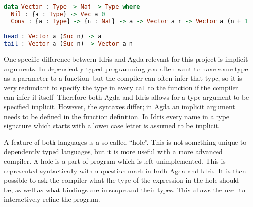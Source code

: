 
\begin{lstlisting}[language=Haskell,label={lst:depex},caption={Definition of
a vector type in Idris, the type signatures of \textit{head} and \textit{tail}. \textit{n} is a type parameter, in this case it is a natural number.  }]
data Vector : Type -> Nat -> Type where
  Nil : {a : Type} -> Vec a 0
  Cons : {a : Type} -> {n : Nat} -> a -> Vector a n -> Vector a (n + 1)

head : Vector a (Suc n) -> a
tail : Vector a (Suc n) -> Vector a n
\end{lstlisting}




%

One specific difference between Idris and Agda relevant for this project is
implicit arguments. In dependently typed programming you often want to have
some type as a parameter to a function, but the compiler can often infer that
type, so it is very redundant to specify the type in every call to the function
if the compiler can infer it itself. Therefore both Agda and Idris allows for
a type argument to be specified implicit. However, the syntaxes differ; in Agda
an implicit argument needs to be defined in the function definition. In Idris
every name in a type signature which starts with a lower case letter is assumed
to be implicit.

A feature of both languages is a so called ``hole''. This is not something unique
to dependently typed languages, but it is more useful with a more advanced
compiler. A hole is a part of program which is left unimplemented. This is
represented syntactically with a question mark in both Agda and Idris. It
is then possible to ask the compiler what the type of the expression in the
hole should be, as well as what bindings are in scope and their types. This
allows the user to interactively refine the program.


